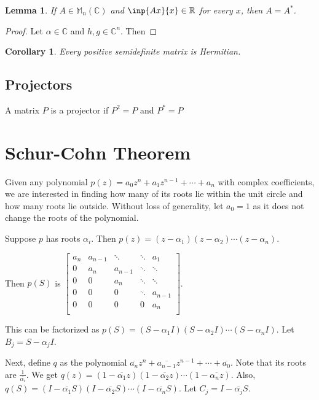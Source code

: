 \documentclass[twofold]{article}
\newcommand*\conj[1]{\overline{#1}}
\newcommand*\adj[1]{#1^*}
\theoremstyle{plain}
\newtheorem*{corollary}{Corollary}
\newtheorem*{lemma}{Lemma}
\theoremstyle{definition}
\begin{document}
\begin{lemma} If \(A \in \mathbb{M}_n (\mathbb{C})\) and \(\inp{Ax}{x} \in \mathbb{R}\) for every \(x\), then \(A = \adj{A}\). \end{lemma}
\begin{proof} Let \(\alpha \in \mathbb{C}\) and \(h, g \in \mathbb{C}^n\). Then \end{proof}

\begin{corollary}Every positive semidefinite matrix is Hermitian.\end{corollary}

\subsection{Projectors}
A matrix \(P\) is a projector if \(P^2 = P\) and \(\adj{P} = P\)


\section{Schur-Cohn Theorem}

Given any polynomial \(p(z) = a_0 z^n + a_1z^{n-1} + \cdots + a_n\) with complex coefficients, we are interested in finding how many of its roots lie within the unit circle and how many roots lie outside. Without loss of generality, let \(a_0 = 1\) as it does not change the roots of the polynomial. 

Suppose \(p\) has roots \(\alpha_i\). Then \(p(z) = (z - \alpha_1) (z - \alpha_2) \cdots (z - \alpha_n)\). 

 Then \(p(S) \) is \( \begin{bmatrix} 

a_n & a_{n-1} & \ddots & \ddots & a_1 \\
0 & a_n & a_{n-1} & \ddots & \ddots \\
0 & 0 & a_n & \ddots & \ddots \\
0 & 0 & 0 &\ddots & a_{n-1} \\
0 & 0 & 0 & 0 & a_n \\ 
\end{bmatrix}\). 


This can be factorized as \(p(S) = (S - \alpha_1I) (S - \alpha_2 I) \cdots (S - \alpha_n I)\). Let \(B_j = S - \alpha_jI\).

Next, define \(q\) as the polynomial \(\conj{a_n}z^n + \conj{a_{n-1}}z^{n-1} + \cdots + \conj{a_0}\). Note that its roots are \(\frac {1}{\conj{\alpha_i}}\). We get \(q(z) = (1 - \conj{\alpha_1}z) (1 - \conj{\alpha_2}z) \cdots (1 - \conj{\alpha_nz})\). Also, \(q(S) = (I - \conj{\alpha_1}S) (I - \conj{\alpha_2}S) \cdots (I - \conj{\alpha_n}S)\). Let \(C_j= I -  \conj{\alpha_j} S\).
\end{document}
